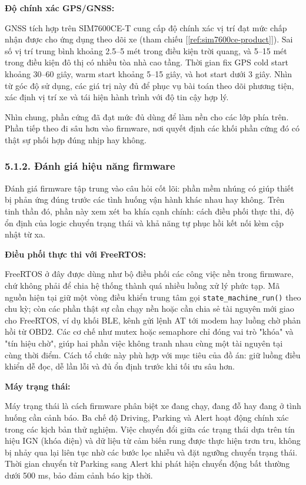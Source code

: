 \documentclass[a4paper]{extarticle}
\newcommand{\ieeecite}[1]{[\ref{#1}]}
\providecommand{\textcite}[1]{\ieeecite{#1}}
\begin{document}
\textbf{Độ chính xác GPS/GNSS:}

GNSS tích hợp trên SIM7600CE-T cung cấp độ chính xác vị trí đạt mức chấp
nhận được cho ứng dụng theo dõi xe (tham chiếu
\textcite{ref:sim7600ce-product}). Sai số vị trí trung bình khoảng
2.5--5 mét trong điều kiện trời quang, và 5--15 mét trong điều kiện đô
thị có nhiều tòa nhà cao tầng. Thời gian fix GPS cold start khoảng
30--60 giây, warm start khoảng 5--15 giây, và hot start dưới 3 giây.
Nhìn từ góc độ sử dụng, các giá trị này đủ để phục vụ bài toán theo dõi
phương tiện, xác định vị trí xe và tái hiện hành trình với độ tin cậy
hợp lý.

Nhìn chung, phần cứng đã đạt mức đủ dùng để làm nền cho các lớp phía
trên. Phần tiếp theo đi sâu hơn vào firmware, nơi quyết định các khối
phần cứng đó có thật sự phối hợp đúng nhịp hay không.

\subsubsection{5.1.2. Đánh giá hiệu năng
firmware}\label{512-ux111uxe1nh-giuxe1-hiux1ec7u-nux103ng-firmware}

Đánh giá firmware tập trung vào câu hỏi cốt lõi: phần mềm nhúng có giúp
thiết bị phản ứng đúng trước các tình huống vận hành khác nhau hay
không. Trên tinh thần đó, phần này xem xét ba khía cạnh chính: cách
điều phối thực thi, độ ổn định của logic chuyển trạng thái và khả năng
tự phục hồi kết nối kèm cập nhật từ xa.

\textbf{Điều phối thực thi với FreeRTOS:}

FreeRTOS ở đây được dùng như bộ điều phối các công việc nền trong
firmware, chứ không phải để chia hệ thống thành quá nhiều luồng xử lý
phức tạp. Mã nguồn hiện tại giữ một vòng điều khiển trung tâm gọi
\texttt{state\_machine\_run()} theo chu kỳ; còn các phần thật sự cần
chạy nền hoặc cần chia sẻ tài nguyên mới giao cho FreeRTOS, ví dụ khối
BLE, kênh gửi lệnh AT tới modem hay luồng chờ phản hồi từ OBD2. Các cơ
chế như mutex hoặc semaphore chỉ đóng vai trò "khóa" và "tín hiệu chờ",
giúp hai phần việc không tranh nhau cùng một tài nguyên tại cùng thời
điểm. Cách tổ chức này phù hợp với mục tiêu của đồ án: giữ luồng điều
khiển dễ đọc, dễ lần lỗi và đủ ổn định trước khi tối ưu sâu hơn.

\textbf{Máy trạng thái:}

Máy trạng thái là cách firmware phân biệt xe đang chạy, đang đỗ hay đang
ở tình huống cần cảnh báo. Ba chế độ Driving, Parking và Alert hoạt động
chính xác trong các kịch bản thử nghiệm. Việc chuyển đổi giữa các trạng
thái dựa trên tín hiệu IGN (khóa điện) và dữ liệu từ cảm biến rung được
thực hiện trơn tru, không bị nhảy qua lại liên tục nhờ các bước lọc
nhiễu và đặt ngưỡng chuyển trạng thái. Thời gian chuyển từ Parking sang
Alert khi phát hiện chuyển động bất thường dưới 500 ms, bảo đảm cảnh báo
kịp thời.
\end{document}
